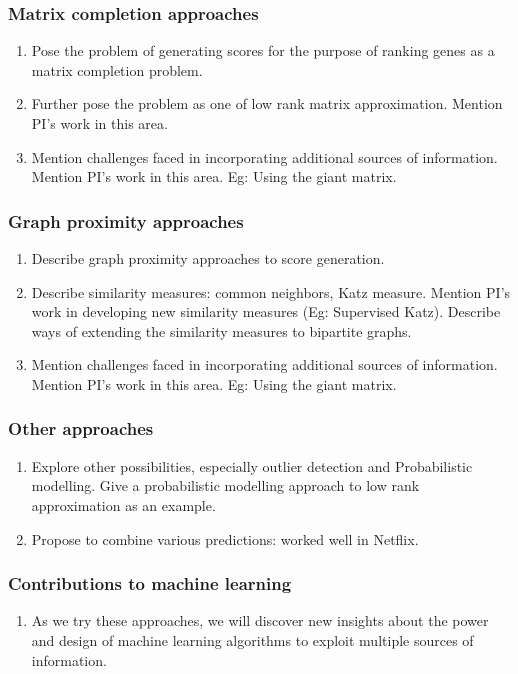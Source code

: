 \documentclass[11pt]{article}
\begin{document}
\subsubsection{Matrix completion approaches}
\begin{enumerate}
 \item Pose the problem of generating scores for the purpose of ranking genes as a matrix completion problem.
 \item Further pose the problem as one of low rank matrix approximation. Mention PI's work in this area.
 \item Mention challenges faced in incorporating additional sources of information. Mention PI's work in this area.
  \subitem Eg: Using the giant matrix.
\end{enumerate}

\subsubsection{Graph proximity approaches}
\begin{enumerate}
 \item Describe graph proximity approaches to score generation.
 \item Describe similarity measures: common neighbors, Katz measure. Mention PI's work in developing new similarity measures (Eg: Supervised Katz).
 \subitem Describe ways of extending the similarity measures to bipartite graphs.
 \item Mention challenges faced in incorporating additional sources of information. Mention PI's work in this area.
  \subitem Eg: Using the giant matrix.
\end{enumerate}

\subsubsection{Other approaches}
\begin{enumerate}
 \item Explore other possibilities, especially outlier detection and Probabilistic modelling. Give a probabilistic modelling approach to low rank approximation as an example.
 \item Propose to combine various predictions: worked well in Netflix.
\end{enumerate}

\subsubsection{Contributions to machine learning}
\begin{enumerate}
\item As we try these approaches, we will discover new insights about the power and design of machine learning algorithms to exploit multiple sources of information.
\end{enumerate}
\end{document}
